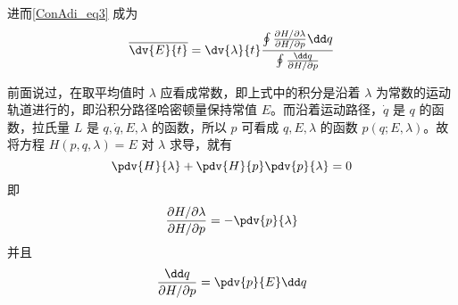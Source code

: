 进而\autoref{ConAdi_eq3} 成为
\begin{equation}\label{ConAdi_eq5}
\overline{\dv{E}{t}}=\dv{\lambda}{t}
\frac{\oint\frac{\partial{H}/\partial{\lambda}}{\partial{H}/\partial{p}}\dd q}
{\oint\frac{\dd q}{\partial{H}/\partial{p}}}
\end{equation}

前面说过，在取平均值时 $\lambda$ 应看成常数，即上式中的积分是沿着 $\lambda$ 为常数的运动轨道进行的，即沿积分路径哈密顿量保持常值 $E$。而沿着运动路径，$\dot q$ 是 $q$ 的函数，拉氏量 $L$ 是 $q,\dot q,E,\lambda$ 的函数，所以 $p$ 可看成 $q,E,\lambda$ 的函数 $p(q;E,\lambda)$。故将方程 $H(p,q,\lambda)=E$ 对 $\lambda$ 求导，就有
\begin{equation}
\pdv{H}{\lambda}+\pdv{H}{p}\pdv{p}{\lambda}=0
\end{equation}
即 
\begin{equation}
\frac{\partial{H}/\partial{\lambda}}{\partial{H}/\partial{p}}=-\pdv{p}{\lambda}
\end{equation}
并且
\begin{equation}
\frac{\dd q}{\partial{H}/\partial{p}}=\pdv{p}{E}\dd q
\end{equation}

